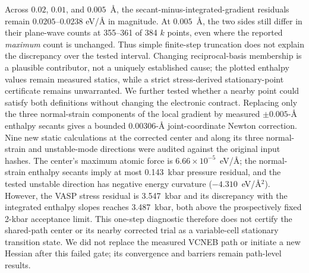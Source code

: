 \documentclass[final,5p,times,twocolumn]{elsarticle}
\begin{document}
Across $0.02$, $0.01$, and $0.005$~\AA{}, the secant-minus-integrated-gradient
residuals remain $0.0205$--$0.0238$ eV/\AA{} in magnitude. At $0.005$~\AA{},
the two sides still differ in their plane-wave counts at 355--361 of 384
$k$ points, even where the reported \emph{maximum} count is unchanged.
Thus simple finite-step truncation does not explain the discrepancy over
the tested interval. Changing reciprocal-basis membership is a plausible
contributor, not a uniquely established cause; the plotted enthalpy values
remain measured statics, while a strict stress-derived stationary-point
certificate remains unwarranted.
We further tested whether a nearby point could satisfy both definitions
without changing the electronic contract. Replacing only the three
normal-strain components of the local gradient by measured
$\pm0.005$-\AA{} enthalpy secants gives a bounded 0.00306-\AA{}
joint-coordinate Newton correction. Nine new static calculations at the
corrected center and along its three normal-strain and unstable-mode
directions were audited against the original input hashes. The center's
maximum atomic force is $6.66\times10^{-5}$~eV/\AA{}; the normal-strain
enthalpy secants imply at most 0.143~kbar pressure residual, and the tested
unstable direction has negative energy curvature
($-4.310$~eV/\AA$^2$). However, the VASP stress residual is 3.547~kbar
and its discrepancy with the integrated enthalpy slopes reaches
3.487~kbar, both above the prospectively fixed 2-kbar acceptance limit.
This one-step diagnostic therefore does not certify the shared-path center
or its nearby corrected trial as a variable-cell stationary transition
state. We did not replace the measured VCNEB path or initiate a new Hessian
after this failed gate; its convergence and barriers remain path-level
results.
\end{document}
